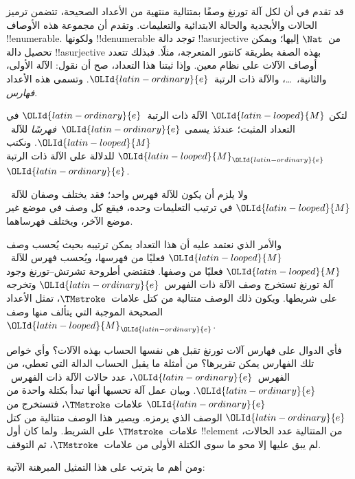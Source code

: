 \documentclass[../../../include/open-logic-section]{subfiles}
\begin{document}

قد تقدم في  أن لكل آلة تورنغ وصفًا بمتتالية
منتهية من الأعداد الصحيحة، تتضمن ترميز الحالات والأبجدية والحالة
الابتدائية والتعليمات. وتقدم أن مجموعة هذه الأوصاف !!{enumerable}.
ولكونها !!{denumerable} توجد دالة !!a{surjective} من~$\Nat$ إليها؛
ويمكن تحصيل دالة !!a{surjective} بهذه الصفة بطريقة كانتور المتعرجة،
مثلًا. فبذلك تتعدد أوصاف الآلات على نظام معين. وإذا ثبتنا هذا
التعداد، صح أن نقول: الآلة الأولى، والثانية،~\dots، والآلة ذات
الرتبة~${\OLId{latin-ordinary}{e}}$. وتسمى هذه الأعداد \emph{فهارس}.

\begin{defn}
لتكن ${\OLId{latin-looped}{M}}$ الآلة ذات الرتبة~${\OLId{latin-ordinary}{e}}$ في التعداد المثبت؛ عندئذ يسمى
${\OLId{latin-ordinary}{e}}$~\emph{فهرسًا} للآلة~${\OLId{latin-looped}{M}}$. ونكتب ${\OLId{latin-looped}{M}}_{\OLId{latin-ordinary}{e}}$ للدلالة على الآلة ذات
الرتبة~${\OLId{latin-ordinary}{e}}$.
\end{defn}

ولا يلزم أن يكون للآلة فهرس واحد؛ فقد يختلف وصفان للآلة~${\OLId{latin-looped}{M}}$
في ترتيب التعليمات وحده، فيقع كل وصف في موضع غير موضع الآخر،
ويختلف فهرساهما.

والأمر الذي نعتمد عليه أن هذا التعداد يمكن ترتيبه بحيث يُحسب وصف
${\OLId{latin-looped}{M}}$ فعليًا من فهرسها، ويُحسب فهرس للآلة~${\OLId{latin-looped}{M}}$ فعليًا من وصفها.
فتقتضي أطروحة تشرتش--تورنغ وجود آلة تورنغ تستخرج وصف الآلة ذات
الفهرس~${\OLId{latin-ordinary}{e}}$ وتخرجه على شريطها. ويكون ذلك الوصف متتالية من كتل
علامات~$\TMstroke$، تمثل الأعداد الصحيحة الموجبة التي يتألف منها
وصف~${\OLId{latin-looped}{M}}_{\OLId{latin-ordinary}{e}}$.

فأي الدوال على فهارس آلات تورنغ تقبل هي نفسها الحساب بهذه الآلات؟
وأي خواص تلك الفهارس يمكن تقريرها؟ من أمثلة ما يقبل الحساب الدالة
التي تعطي، من الفهرس~${\OLId{latin-ordinary}{e}}$، عدد حالات الآلة ذات الفهرس~${\OLId{latin-ordinary}{e}}$.
وبيان عمل آلة تحسبها أنها تبدأ بكتلة واحدة من ${\OLId{latin-ordinary}{e}}$ علامات
$\TMstroke$، فتستخرج من ${\OLId{latin-ordinary}{e}}$ الوصف الذي يرمزه. ويصير هذا الوصف
متتالية من كتل علامات~$\TMstroke$ على الشريط. ولما كان أول
!!{element} من المتتالية عدد الحالات، لم يبق عليها إلا محو ما سوى
الكتلة الأولى من علامات~$\TMstroke$، ثم التوقف.

ومن أهم ما يترتب على هذا التمثيل المبرهنة الآتية:
\end{document}

